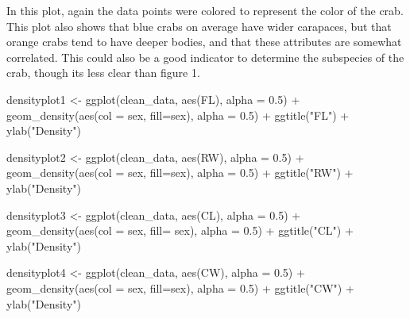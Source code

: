 \documentclass[
]{article}
\newenvironment{Shaded}{}{}
\newcommand{\AttributeTok}[1]{#1}
\newcommand{\FloatTok}[1]{#1}
\newcommand{\FunctionTok}[1]{#1}
\newcommand{\NormalTok}[1]{#1}
\newcommand{\OtherTok}[1]{\textcolor[rgb]{1.00,0.25,0.00}{#1}}
\newcommand{\SpecialCharTok}[1]{\textcolor[rgb]{0.00,0.50,0.50}{#1}}
\newcommand{\StringTok}[1]{\textcolor[rgb]{0.00,0.50,0.50}{#1}}
\begin{document}
In this plot, again the data points were colored to represent the color
of the crab. This plot also shows that blue crabs on average have wider
carapaces, but that orange crabs tend to have deeper bodies, and that
these attributes are somewhat correlated. This could also be a good
indicator to determine the subspecies of the crab, though its less clear
than figure 1. \newpage

\begin{Shaded}
\begin{Highlighting}[]
\NormalTok{densityplot1 }\OtherTok{\textless{}{-}} \FunctionTok{ggplot}\NormalTok{(clean\_data, }\FunctionTok{aes}\NormalTok{(FL), }\AttributeTok{alpha =} \FloatTok{0.5}\NormalTok{) }\SpecialCharTok{+} \FunctionTok{geom\_density}\NormalTok{(}\FunctionTok{aes}\NormalTok{(}\AttributeTok{col =}\NormalTok{ sex, }\AttributeTok{fill=}\NormalTok{sex), }
                                                                        \AttributeTok{alpha =} \FloatTok{0.5}\NormalTok{) }\SpecialCharTok{+}
\FunctionTok{ggtitle}\NormalTok{(}\StringTok{"FL"}\NormalTok{) }\SpecialCharTok{+} \FunctionTok{ylab}\NormalTok{(}\StringTok{"Density"}\NormalTok{)}


\NormalTok{densityplot2 }\OtherTok{\textless{}{-}} \FunctionTok{ggplot}\NormalTok{(clean\_data, }\FunctionTok{aes}\NormalTok{(RW), }\AttributeTok{alpha =} \FloatTok{0.5}\NormalTok{) }\SpecialCharTok{+} \FunctionTok{geom\_density}\NormalTok{(}\FunctionTok{aes}\NormalTok{(}\AttributeTok{col =}\NormalTok{ sex, }\AttributeTok{fill=}\NormalTok{sex), }
                                                                        \AttributeTok{alpha =} \FloatTok{0.5}\NormalTok{) }\SpecialCharTok{+}
\FunctionTok{ggtitle}\NormalTok{(}\StringTok{"RW"}\NormalTok{) }\SpecialCharTok{+} \FunctionTok{ylab}\NormalTok{(}\StringTok{"Density"}\NormalTok{)}

\NormalTok{densityplot3 }\OtherTok{\textless{}{-}} \FunctionTok{ggplot}\NormalTok{(clean\_data, }\FunctionTok{aes}\NormalTok{(CL), }\AttributeTok{alpha =} \FloatTok{0.5}\NormalTok{) }\SpecialCharTok{+} \FunctionTok{geom\_density}\NormalTok{(}\FunctionTok{aes}\NormalTok{(}\AttributeTok{col =}\NormalTok{ sex, }\AttributeTok{fill=}\NormalTok{ sex), }
                                                                        \AttributeTok{alpha =} \FloatTok{0.5}\NormalTok{) }\SpecialCharTok{+}
\FunctionTok{ggtitle}\NormalTok{(}\StringTok{"CL"}\NormalTok{) }\SpecialCharTok{+} \FunctionTok{ylab}\NormalTok{(}\StringTok{"Density"}\NormalTok{)}

\NormalTok{densityplot4 }\OtherTok{\textless{}{-}} \FunctionTok{ggplot}\NormalTok{(clean\_data, }\FunctionTok{aes}\NormalTok{(CW), }\AttributeTok{alpha =} \FloatTok{0.5}\NormalTok{) }\SpecialCharTok{+} \FunctionTok{geom\_density}\NormalTok{(}\FunctionTok{aes}\NormalTok{(}\AttributeTok{col =}\NormalTok{ sex, }\AttributeTok{fill=}\NormalTok{sex), }
                                                                        \AttributeTok{alpha =} \FloatTok{0.5}\NormalTok{) }\SpecialCharTok{+}
\FunctionTok{ggtitle}\NormalTok{(}\StringTok{"CW"}\NormalTok{) }\SpecialCharTok{+} \FunctionTok{ylab}\NormalTok{(}\StringTok{"Density"}\NormalTok{)}


\end{Highlighting}
\end{Shaded}
\end{document}
